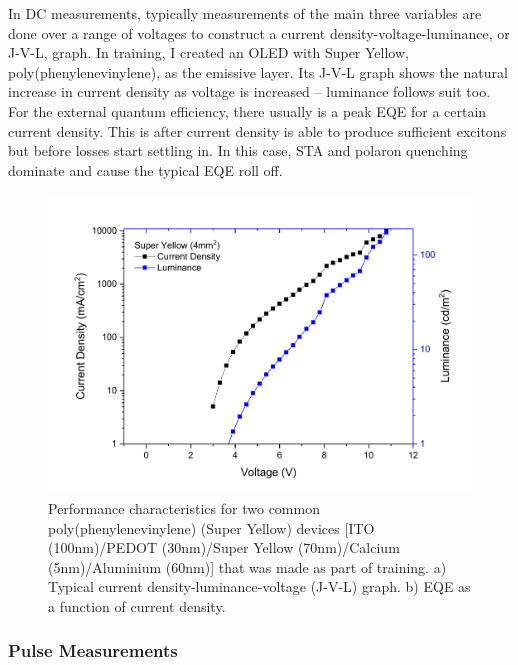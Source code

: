 \documentclass[
  letterpaper,
  DIV=11,
  numbers=noendperiod,
  oneside]{scrreprt}
\begin{document}
In DC measurements, typically measurements of the main three variables
are done over a range of voltages to construct a current
density-voltage-luminance, or J-V-L, graph. In training, I created an
OLED with Super Yellow, poly(phenylenevinylene), as the emissive layer.
Its J-V-L graph shows the natural increase in current density as voltage
is increased -- luminance follows suit too. For the external quantum
efficiency, there usually is a peak EQE for a certain current density.
This is after current density is able to produce sufficient excitons but
before losses start settling in. In this case, STA and polaron quenching
dominate and cause the typical EQE roll off.

\begin{figure}

{\centering \includegraphics{./images/JVLSY.pdf}

}

\caption{\label{fig-perfo}Performance characteristics for two common
poly(phenylenevinylene) (Super Yellow) devices {[}ITO (100nm)/PEDOT
(30nm)/Super Yellow (70nm)/Calcium (5nm)/Aluminium (60nm){]} that was
made as part of training. a) Typical current density-luminance-voltage
(J-V-L) graph. b) EQE as a function of current density.}

\end{figure}

\hypertarget{pulse-measurements}{%
\subsubsection{Pulse Measurements}\label{pulse-measurements}}
\end{document}
